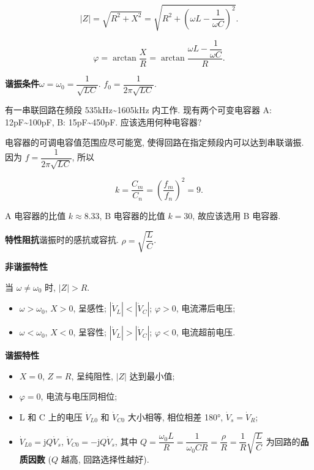 \documentclass{notes}
\begin{document}
\begin{equation}
    |Z|=\sqrt{R^2+X^2}=\sqrt{R^2+\left(\omega L-\frac{1}{\omega C}\right)^2}.
\end{equation}

\begin{equation}
    \varphi=\arctan\frac{X}{R}=\arctan\frac{\omega L-\dfrac{1}{\omega C}}{R}.
\end{equation}

\textbf{谐振条件}\quad $\omega=\omega_0=\dfrac{1}{\sqrt{LC}}$. $f_0=\dfrac{1}{2\pi\sqrt{LC}}$.

\begin{exampleprob}
    有一串联回路在频段 535kHz\textasciitilde 1605kHz 内工作. 现有两个可变电容器 A: 12pF\textasciitilde 100pF, B: 15pF\textasciitilde 450pF. 应该选用何种电容器?

    \begin{solution}
        电容器的可调电容值范围应尽可能宽, 使得回路在指定频段内可以达到串联谐振. 因为 $f=\dfrac{1}{2\pi\sqrt{LC}}$, 所以

        \begin{equation*}
            k=\frac{C_m}{C_n}=\left(\frac{f_m}{f_n}\right)^2=9.
        \end{equation*}

        A 电容器的比值 $k\approx 8.33$, B 电容器的比值 $k=30$, 故应该选用 B 电容器.
    \end{solution}
\end{exampleprob}

\textbf{特性阻抗}\quad 谐振时的感抗或容抗. $\rho=\sqrt{\dfrac{L}{C}}$.

\textbf{非谐振特性}

当 $\omega\neq\omega_0$ 时, $|Z|>R$.

\begin{itemize}
    \item $\omega>\omega_0$, $X>0$, 呈感性; $|\dot{V}_L|<|\dot{V}_C|$; $\varphi>0$, 电流滞后电压;
    \item $\omega<\omega_0$, $X<0$, 呈容性; $|\dot{V}_L|>|\dot{V}_C|$; $\varphi<0$, 电流超前电压.
\end{itemize}

\textbf{谐振特性}

\begin{itemize}
    \item $X=0$, $Z=R$, 呈纯阻性, $|Z|$ 达到最小值;
    \item $\varphi=0$, 电流与电压同相位;
    \item L 和 C 上的电压 $\dot{V}_{L0}$ 和 $\dot{V}_{C0}$ 大小相等, 相位相差 180°, $\dot{V}_s=\dot{V}_R$;
    \item $\dot{V}_{L0}=\mathrm{j}Q\dot{V}_s$, $\dot{V}_{C0}=-\mathrm{j}Q\dot{V}_s$, 其中 $Q=\dfrac{\omega_0L}{R}=\dfrac{1}{\omega_0CR}=\dfrac{\rho}{R}=\dfrac{1}{R}\sqrt{\dfrac{L}{C}}$ 为回路的\textbf{品质因数} ($Q$ 越高, 回路选择性越好).
\end{itemize}
\end{document}
